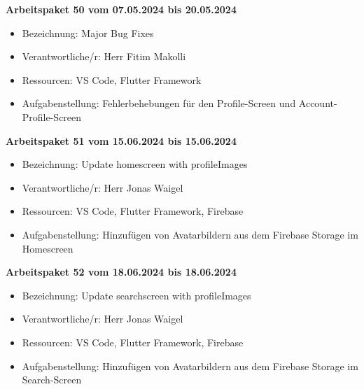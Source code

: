 \textbf{Arbeitspaket 50 vom 07.05.2024 bis 20.05.2024}
\begin{itemize}[itemsep=0pt]
    \item{Bezeichnung: Major Bug Fixes} 
	\item{Verantwortliche/r: Herr Fitim Makolli} 
	\item{Ressourcen: VS Code, Flutter Framework} 
    \item{Aufgabenstellung: Fehlerbehebungen für den Profile-Screen und Account-Profile-Screen}
\end{itemize} 

\newpage
\textbf{Arbeitspaket 51 vom 15.06.2024 bis 15.06.2024}
\begin{itemize}[itemsep=0pt]
    \item{Bezeichnung: Update homescreen with profileImages} 
	\item{Verantwortliche/r: Herr Jonas Waigel} 
	\item{Ressourcen: VS Code, Flutter Framework, Firebase} 
    \item{Aufgabenstellung: Hinzufügen von Avatarbildern aus dem Firebase Storage im Homescreen}
\end{itemize}


\textbf{Arbeitspaket 52 vom 18.06.2024 bis 18.06.2024}
\begin{itemize}[itemsep=0pt]
    \item{Bezeichnung: Update searchscreen with profileImages} 
	\item{Verantwortliche/r: Herr Jonas Waigel} 
	\item{Ressourcen: VS Code, Flutter Framework, Firebase} 
    \item{Aufgabenstellung: Hinzufügen von Avatarbildern aus dem Firebase Storage im Search-Screen}
\end{itemize}



